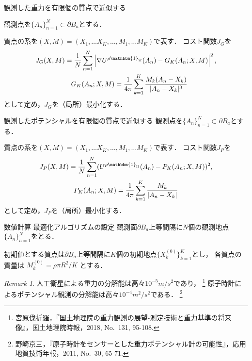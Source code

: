 \documentclass[dvipdfmx]{beamer}
\theoremstyle{remark}
\newtheorem*{rem*}{Remark}
\begin{document}
\begin{frame}{観測した重力を有限個の質点で近似する}

  観測点を$\{A_n\}_{n=1}^N\subset \partial B_a$とする．

  質点の系を$(X,M)=(X_1,\dots X_K,\dots ,M_1,\dots M_K)$で表す．
  コスト関数$J_G$を
  \begin{gather*}
    J_G(X, M) = \frac{1}{N}\sum_{n=1}^N\left|\nabla U^{\rho\mathbbm{1}_\Omega}(A_n) - G_K(A_n;X,M)\right|^2,\\ 
    \quad G_K(A_n;X,M) = \frac{1}{4\pi}\sum_{k=1}^K\frac{M_k(A_n-X_k)}{|A_n-X_k|^3}
  \end{gather*}
  として定め，$J_G$を（局所）最小化する．
\end{frame}

\begin{frame}{観測したポテンシャルを有限個の質点で近似する}
  観測点を$\{A_n\}_{n=1}^N\subset \partial B_a$とする．

  質点の系を$(X,M)=(X_1,\dots X_K,\dots ,M_1,\dots M_K)$で表す．
  コスト関数$J_P$を
  \begin{gather*}
    J_P(X, M) = \frac{1}{N}\sum_{n=1}^N(U^{\rho\mathbbm{1}_\Omega}(A_n) - P_K(A_n;X,M))^2, \\
    P_K(A_n;X,M) = \frac{1}{4\pi}\sum_{k=1}^K \frac{M_k}{|A_n-X_k|}
  \end{gather*}
  として定め，$J_P$を（局所）最小化する．
\end{frame}

\begin{frame}{数値計算 最適化アルゴリズムの設定}
観測面$\partial B_a$上等間隔に$N$個の観測地点$\{A_n\}_{n=1}^N$をとる．

初期値とする質点は$\partial B_{a}$上等間隔に$K$個の初期地点$\{X_k^{(0)}\}_{k=1}^K$とし，
各質点の質量は $M_k^{(0)} = \rho\pi R^2/K$ とする．


\begin{rem*}
  人工衛星による重力の分解能は高々$10^{-5}\si{m/s^2}$であり，
  \footnote{宮原伐折羅，『国土地理院の重力観測の展望-測定技術と重力基準の将来像』，国土地理院時報，2018, No.~131, 95-108.}
  原子時計によるポテンシャル観測の分解能は高々$10^{-4}\si{m^2/s^2}$である．
  \footnote{野崎京三，『原子時計をセンサーとした重力ポテンシャル計の可能性』，応用地質技術年報，2011, No.~30, 65-71.}
\end{rem*}

\end{frame}

\end{document}
